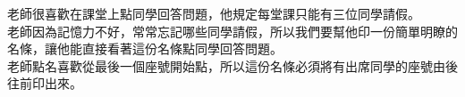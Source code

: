 老師很喜歡在課堂上點同學回答問題，他規定每堂課只能有三位同學請假。\\
老師因為記憶力不好，常常忘記哪些同學請假，所以我們要幫他印一份簡單明瞭的名條，讓他能直接看著這份名條點同學回答問題。\\
老師點名喜歡從最後一個座號開始點，所以這份名條必須將有出席同學的座號由後往前印出來。\\
